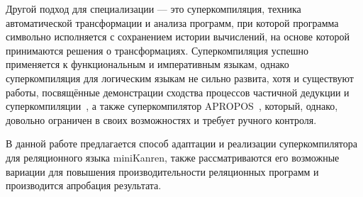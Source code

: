 Другой подход для специализации --- это суперкомпиляция, 
техника автоматической трансформации и анализа программ,
при которой программа символьно исполняется с сохранением истории вычислений,
на основе которой принимаются решения о трансформациях.
Суперкомпиляция успешно применяется к функциональным и императивным языкам,
однако суперкомпиляция для логическим языкам не сильно развита, хотя и существуют
работы, посвящённые демонстрации сходства процессов частичной дедукции и суперкомпиляции~\cite{pdAndDriving},
а также суперкомпилятор APROPOS~\cite{apropos}, который, однако, довольно ограничен
в своих возможностях и требует ручного контроля.

В данной работе предлагается способ адаптации и реализации суперкомпилятора для
реляционного языка miniKanren, также рассматриваются его возможные вариации для
повышения производительности реляционных программ и производится апробация результата.
